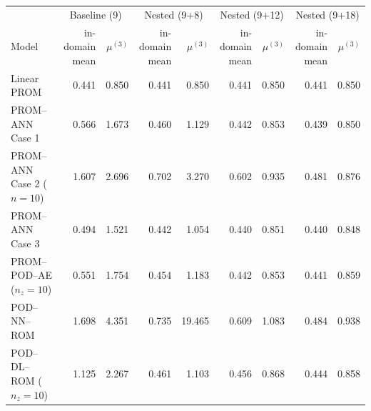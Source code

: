 \begin{tabular}{lrr|rr|rr|rr}
\toprule
& \multicolumn{2}{c|}{Baseline (9)} & \multicolumn{2}{c|}{Nested (9+8)} & \multicolumn{2}{c|}{Nested (9+12)} & \multicolumn{2}{c}{Nested (9+18)} \\
Model & \shortstack{in-domain\\mean} & $\mu^{(3)}$ & \shortstack{in-domain\\mean} & $\mu^{(3)}$ & \shortstack{in-domain\\mean} & $\mu^{(3)}$ & \shortstack{in-domain\\mean} & $\mu^{(3)}$ \\
\midrule
Linear PROM & 0.441 & 0.850 & 0.441 & 0.850 & 0.441 & 0.850 & 0.441 & 0.850 \\
PROM--ANN Case 1 & 0.566 & 1.673 & 0.460 & 1.129 & 0.442 & 0.853 & 0.439 & 0.850 \\
PROM--ANN Case 2 ($n=10$) & 1.607 & 2.696 & 0.702 & 3.270 & 0.602 & 0.935 & 0.481 & 0.876 \\
PROM--ANN Case 3 & 0.494 & 1.521 & 0.442 & 1.054 & 0.440 & 0.851 & 0.440 & 0.848 \\
PROM--POD--AE ($n_z=10$) & 0.551 & 1.754 & 0.454 & 1.183 & 0.442 & 0.853 & 0.441 & 0.859 \\
\midrule
POD--NN--ROM & 1.698 & 4.351 & 0.735 & 19.465 & 0.609 & 1.083 & 0.484 & 0.938 \\
POD--DL--ROM ($n_z=10$) & 1.125 & 2.267 & 0.461 & 1.103 & 0.456 & 0.868 & 0.444 & 0.858 \\
\bottomrule
\end{tabular}
